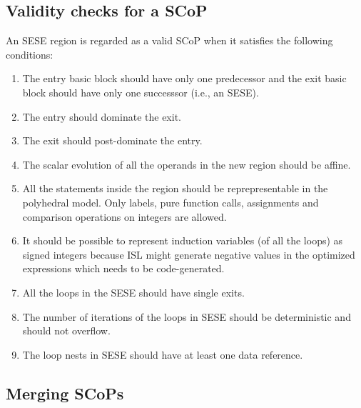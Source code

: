 \documentclass{sigplanconf}
\begin{document}


\subsection{Validity checks for a SCoP}
\label{subsec:validity}
An SESE region is regarded as a valid SCoP when it satisfies the following
conditions:
\begin{enumerate}
\item The entry basic block should have only one predecessor and the exit
  basic block should have only one successsor (i.e., an SESE).
\item The entry should dominate the exit.
\item The exit should post-dominate the entry.
\item The scalar evolution of all the operands in the new region should be affine.
\item All the statements inside the region should be reprepresentable in the
  polyhedral model.  Only labels, pure function calls, assignments and
  comparison operations on integers are allowed.
\item It should be possible to represent induction variables (of all the loops)
  as signed integers because ISL might generate negative values in the optimized
  expressions which needs to be code-generated.
\item All the loops in the SESE should have single exits.
\item The number of iterations of the loops in SESE should be deterministic and
  should not overflow.
\item The loop nests in SESE should have at least one data reference.
\end{enumerate}

\subsection{Merging SCoPs}
\label{subsec:merge-sese}
\end{document}

